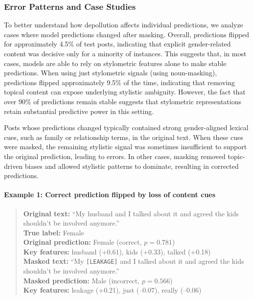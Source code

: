 \documentclass[11pt]{article}
\begin{document}
\subsubsection{Error Patterns and Case Studies}

To better understand how depollution affects individual predictions, we analyze
cases where model predictions changed after masking. Overall, predictions flipped
for approximately 4.5\% of test posts, indicating that explicit gender-related
content was decisive only for a minority of instances. This suggests that, in
most cases, models are able to rely on stylometric features alone to make stable
predictions. When using just stylometric signals (using noun-masking), predictions flipped
approximately 9.5\% of the time, indicating that removing topical content can
expose underlying stylistic ambiguity. However, the fact that over 90\% of
predictions remain stable suggests that stylometric representations retain
substantial predictive power in this setting.

Posts whose predictions changed typically contained strong gender-aligned lexical
cues, such as family or relationship terms, in the original text. When these cues
were masked, the remaining stylistic signal was sometimes insufficient to support
the original prediction, leading to errors. In other cases, masking removed
topic-driven biases and allowed stylistic patterns to dominate, resulting in
corrected predictions.

\paragraph{Example 1: Correct prediction flipped by loss of content cues}
\begin{quote}
\small
\textbf{Original text:} ``My husband and I talked about it and agreed the kids
shouldn’t be involved anymore.'' \\
\textbf{True label:} Female \\
\textbf{Original prediction:} Female (correct, $p=0.781$) \\
\textbf{Key features:} husband (+0.61), kids (+0.33), talked (+0.18) \\
\textbf{Masked text:} ``My \texttt{[LEAKAGE]} and I talked about it and agreed the
kids shouldn’t be involved anymore.'' \\
\textbf{Masked prediction:} Male (incorrect, $p=0.566$) \\
\textbf{Key features:} leakage (+0.21), just (–0.07), really (–0.06)
\end{quote}
\end{document}
